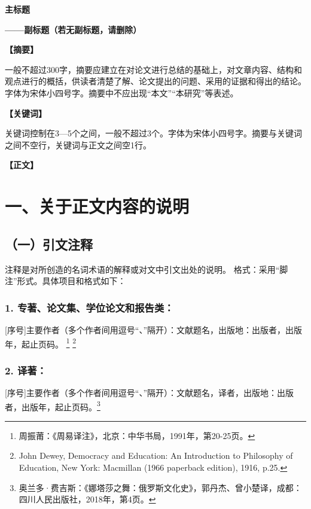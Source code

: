 \documentclass[UTF8,AutoFakeBold]{ctexbook}
\begin{document}
\hypersetup{hidelinks} 
\pagestyle{empty}

\begin{spacing}{1.0}
\begin{center}
     \textbf{主标题}
    
    \textbf{}
    
     \textbf{——副标题（若无副标题，请删除）}\par
\end{center}
\end{spacing}

\setlength{\baselineskip}{20pt}

\noindent\textbf{【摘要】}

一般不超过300字，摘要应建立在对论文进行总结的基础上，对文章内容、结构和观点进行的概括，供读者清楚了解、论文提出的问题、采用的证据和得出的结论。字体为宋体小四号字。摘要中不应出现“本文”“本研究”等表述。

\noindent \textbf{【关键词】} 

关键词控制在3—5个之间，一般不超过3个。字体为宋体小四号字。摘要与关键词之间不空行，关键词与正文之间空1行。

\noindent \textbf{【正文】} 

\setlength{\baselineskip}{20pt}

\section*{一、关于正文内容的说明}

\subsection*{（一）引文注释}

注释是对所创造的名词术语的解释或对文中引文出处的说明。
格式：采用“脚注”形式。具体项目和格式如下：

\subsubsection*{1. 专著、论文集、学位论文和报告类：}
[序号]主要作者（多个作者间用逗号“、”隔开）：文献题名，出版地：出版者，出版年，起止页码。 \footnote[1]{周振莆：《周易译注》，北京：中华书局，1991年，第20-25页。} \footnote[2]{John Dewey, Democracy and Education: An Introduction to Philosophy of Education, New York: Macmillan (1966 paperback edition), 1916, p.25.}

\subsubsection*{2. 译著：}
[序号]主要作者（多个作者间用逗号“、”隔开）：文献题名，译者，出版地：出版者，出版年，起止页码。\footnote[3]{奥兰多·费吉斯：《娜塔莎之舞：俄罗斯文化史》，郭丹杰、曾小楚译，成都：四川人民出版社，2018年，第4页。} 
\end{document}
